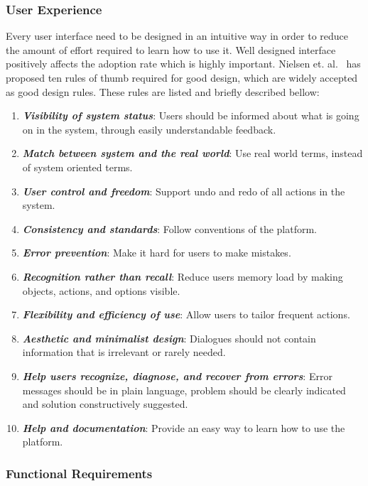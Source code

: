 \subsubsection{User Experience}

Every user interface need to be designed in an intuitive way in order to reduce the amount of effort required to learn how to use it. Well designed interface positively affects the adoption rate which is highly important. Nielsen et. al.~\cite{nielsen199510} has proposed ten rules of thumb required for good design, which are widely accepted as good design rules. These rules are listed and briefly described bellow:

\begin{enumerate}
	\setlength{\itemsep}{1pt}
	\item \textbf{\textit{Visibility of system status}}: Users should be informed about what is going on in the system, through easily understandable feedback.
	\item \textbf{\textit{Match between system and the real world}}: Use real world terms, instead of system oriented terms.
	\item \textbf{\textit{User control and freedom}}: Support undo and redo of all actions in the system.
	\item \textbf{\textit{Consistency and standards}}: Follow conventions of the platform.
	\item \textbf{\textit{Error prevention}}: Make it hard for users to make mistakes.
	\item \textbf{\textit{Recognition rather than recall}}: Reduce users memory load by making objects, actions, and options visible.
	\item \textbf{\textit{Flexibility and efficiency of use}}: Allow users to tailor frequent actions.
	\item \textbf{\textit{Aesthetic and minimalist design}}: Dialogues should not contain information that is irrelevant or rarely needed.
	\item \textbf{\textit{Help users recognize, diagnose, and recover from errors}}: Error messages should be in plain language, problem should be clearly indicated and solution constructively suggested.
	\item \textbf{\textit{Help and documentation}}: Provide an easy way to learn how to use the platform.
\end{enumerate}

\subsubsection{Functional Requirements}

